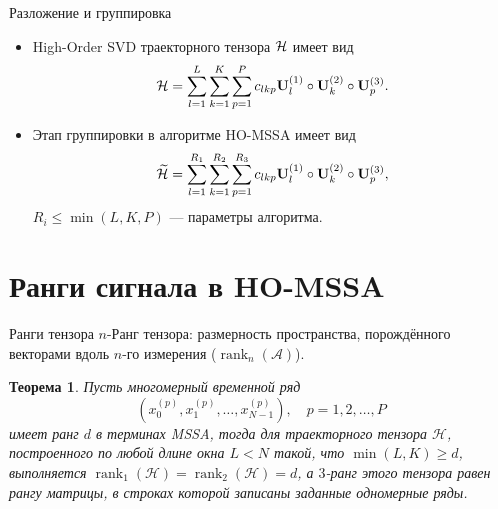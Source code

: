 \documentclass[ucs, notheorems, handout]{beamer}
\newcommand{\bluetext}[1]{{\usebeamercolor[fg]{bluetext_color}#1}}
\newtheorem{theorem}{Теорема}
\begin{document}
    \begin{frame}{Разложение и группировка}
        \begin{itemize}
            \item High-Order SVD траекторного тензора $\mathcal{H}$ имеет вид
            \[
                \mathcal{H} = \sum_{l=1}^{L} \sum_{k=1}^{K} \sum_{p=1}^{P} c_{lkp} \mathbf{U}^{(1)}_{l}
                \circ \mathbf{U}^{(2)}_{k} \circ \mathbf{U}^{(3)}_{p}.
            \]

            \vspace{0.4cm}
            \item Этап группировки в алгоритме HO-MSSA имеет вид
            \[
                \widetilde{\mathcal{H}} = \sum_{l=1}^{R_1} \sum_{k=1}^{R_2} \sum_{p=1}^{R_3} c_{lkp} \mathbf{U}^{(1)}_{l}
                \circ \mathbf{U}^{(2)}_{k} \circ \mathbf{U}^{(3)}_{p},
            \]
            $R_i\leqslant \min(L, K, P)$ --- параметры алгоритма.
        \end{itemize}
    \end{frame}


    \section{Ранги сигнала в HO-MSSA}\label{sec:tensor-ranks}
    \begin{frame}{Ранги тензора}
        \bluetext{$n$-Ранг тензора:} размерность пространства, порождённого
        векторами вдоль $n$-го измерения ($\operatorname{rank}_n(\mathcal{A})$).

        \begin{theorem}
            Пусть многомерный временной ряд
            \[
                \left( x_0^{(p)}, x_1^{(p)}, \ldots, x_{N-1}^{(p)} \right), \quad p=1, 2,\ldots, P
            \]
            имеет ранг $d$ в терминах MSSA, тогда для траекторного тензора $\mathcal{H}$, построенного по любой длине окна $L<N$
            такой, что ${\min(L, K) \geqslant d}$, выполняется $\operatorname{rank}_1(\mathcal{H})=\operatorname{rank}_2(\mathcal{H})=d$,
            а $3$-ранг этого тензора равен рангу матрицы, в строках которой записаны заданные одномерные ряды.
        \end{theorem}
    \end{frame}
\end{document}
